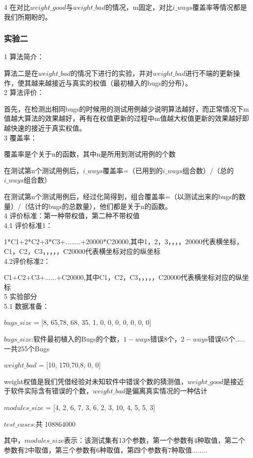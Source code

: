 \documentclass[10pt,journal,letterpaper,compsoc]{IEEEtran}
\begin{document}
\begin{CJK}{UTF8}{gkai}
4 在对比$weight\_good$与$weight\_bad$的情况，m固定，对比$i\_ways$覆盖率等情况都是我们所期盼的。

	\subsubsection{实验二}
1 算法简介： 

	算法二是在$weight\_bad$的情况下进行的实验，并对$weight\_bad$进行不端的更新操作，使其越来越接近与真实的权值（最初植入的bugs的分布）。
\\2 算法评价： 

	首先，在检测出相同bugs的时候用的测试用例越少说明算法越好，而正常情况下m值越大算法的效果越好，再有在权值更新的过程中m值越大权值更新的效果越好即越快速的接近于真实权值。
\\3 覆盖率：

	覆盖率是个关于n的函数，其中n是所用到测试用例的个数

	在测试第n个测试用例后，$i\_ways$覆盖率=（已用到的$i\_ways$组合数）/（总的$i\_ways$组合数）

	在测试第n个测试用例后，经过化简得到，组合覆盖率=（以测试出来的bugs的数量）/（估计的bugs的总数量），他们都是关于n的函数。
\\4 评价标准：第一种带权值，第二种不带权值
\\4.1 评价标准1：

	1*C1+2*C2+3*C3+........+20000*C20000,其中1，2，3，，，，20000代表横坐标，C1，C2，C3，，，，，C20000代表横坐标对应的纵坐标
\\4.2评价标准2：

	C1+C2+C3+......+C20000,其中C1，C2，C3，，，，，C20000代表横坐标对应的纵坐标
\\5 实验部分
\\5.1 数据准备：

	$bugs\_size$ = [8, 65,78, 68, 35, 1, 0, 0, 0, 0, 0, 0, 0]   

	$bugs\_size$:软件最初植入的Bugs的个数，$1-ways$错误8个，$2-ways$错误65个.....一共255个Bugs

	$weight\_bad$ = [10, 170,70,8, 0, 0]

	weight权值是我们凭借经验对未知软件中错误个数的猜测值，$weight\_good$是接近于软件实际含有错误的个数，$weight\_bad$是偏离真实情况的一种估计    

	$modules\_size$ = [4, 2, 6, 7, 3, 6, 2, 3, 10, 4, 5, 5, 3] 

	$test\_cases$:共 108864000

	其中，$modules\_size$表示：该测试集有13个参数，第一个参数有4种取值，第二个参数有2中取值，第三个参数有6种取值，第四个参数有7种取值........


\end{CJK}
\end{document}

